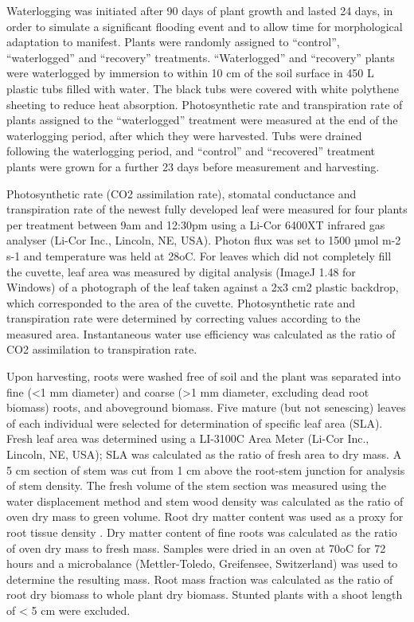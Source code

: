 \documentclass[12pt,a4paper]{memoir}
\begin{document}
Waterlogging was initiated after 90 days of plant growth and lasted 24 days, in order to simulate a significant flooding event and to allow time for morphological adaptation to manifest. Plants were randomly assigned to “control”, “waterlogged” and “recovery” treatments. “Waterlogged” and “recovery” plants were waterlogged by immersion to within 10 cm of the soil surface in 450 L plastic tubs filled with water. The black tubs were covered with white polythene sheeting to reduce heat absorption. Photosynthetic rate and transpiration rate of plants assigned to the “waterlogged” treatment were measured at the end of the waterlogging period, after which they were harvested. Tubs were drained following the waterlogging period, and “control” and “recovered” treatment plants were grown for a further 23 days before measurement and harvesting.

Photosynthetic rate (CO2 assimilation rate), stomatal conductance and transpiration rate of the newest fully developed leaf were measured for four plants per treatment between 9am and 12:30pm using a Li-Cor 6400XT infrared gas analyser (Li-Cor Inc., Lincoln, NE, USA). Photon flux was set to 1500 µmol m-2 s-1 and temperature was held at 28oC. For leaves which did not completely fill the cuvette, leaf area was measured by digital analysis (ImageJ 1.48 for Windows) of a photograph of the leaf taken against a 2x3 cm2 plastic backdrop, which corresponded to the area of the cuvette. Photosynthetic rate and transpiration rate were determined by correcting values according to the measured area. Instantaneous water use efficiency was calculated as the ratio of CO2 assimilation to transpiration rate.

Upon harvesting, roots were washed free of soil and the plant was separated into fine (<1 mm diameter) and coarse (>1 mm diameter, excluding dead root biomass) roots, and aboveground biomass. Five mature (but not senescing) leaves of each individual were selected for determination of specific leaf area (SLA). Fresh leaf area was determined using a LI-3100C Area Meter (Li-Cor Inc., Lincoln, NE, USA); SLA was calculated as the ratio of fresh area to dry mass.  A 5 cm section of stem was cut from 1 cm above the root-stem junction for analysis of stem density. The fresh volume of the stem section was measured using the water displacement method and stem wood density was calculated as the ratio of oven dry mass to green volume. Root dry matter content was used as a proxy for root tissue density \citep{Birouste2013}. Dry matter content of fine roots was calculated as the ratio of oven dry mass to fresh mass. Samples were dried in an oven at 70oC for 72 hours and a microbalance (Mettler-Toledo, Greifensee, Switzerland) was used to determine the resulting mass. Root mass fraction was calculated as the ratio of root dry biomass to whole plant dry biomass. Stunted plants with a shoot length of < 5 cm were excluded.
\end{document}
